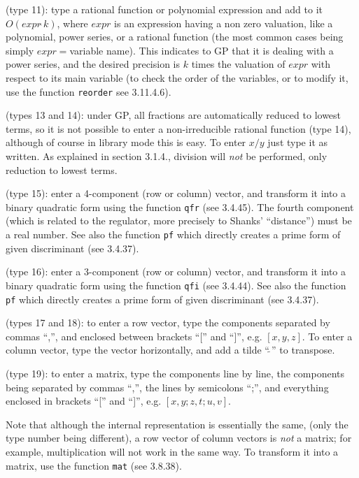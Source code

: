 \subsec{\ref{Power series}} (type 11): type a rational function or
polynomial expression and add to it $O(expr\hat{\ }k)$, where $expr$ is an
expression
having a non zero valuation, like a polynomial, power series, or a
rational function (the most common cases being simply $expr=$variable name).
This indicates
to GP that it is dealing with a power series, and the desired precision
is $k$ times the valuation of $expr$ with respect to its main variable
(to check the order of the variables, or to modify it, use the function
{\tt reorder} see 3.11.4.6).

 (types 13 and 14): under GP, all
fractions are automatically reduced to lowest terms, so it is not possible
to enter a non-irreducible rational function (type 14), although of course in
library mode this is easy. To enter $x/y$ just type it as written.
As explained in section 3.1.4., division will {\sl not} be performed, only
reduction to lowest terms.

 (type 15):
enter a 4-component (row or column) vector, and transform it into a binary
quadratic form using the function {\tt qfr} (see 3.4.45). The fourth component
(which is related to the regulator, more precisely to Shanks' ``distance'')
must be a real number. See also the function {\tt pf} which directly creates
a prime form of given discriminant (see 3.4.37).

 (type 16):
enter a 3-component (row or column) vector, and transform it into a binary
quadratic form using the function {\tt qfi} (see 3.4.44). See also the
function {\tt pf} which directly creates a prime form of given discriminant
(see 3.4.37).

(types 17 and 18):
to enter a row vector, type the components separated by commas ``,'',
and enclosed between brackets ``['' and ``]'', e.g. $[x,y,z]$.
To enter a column vector, type the vector horizontally, and add a tilde
``$\tilde{\ }$'' to transpose.

 (type 19): to enter a matrix, type the
components line by line, the components being separated by commas ``,'',
the lines by semicolons ``;'', and everything enclosed in brackets
``['' and ``]'', e.g. $[x,y;z,t;u,v]$.

Note that although the internal representation is essentially the same,
(only the type number being different), a row vector of column vectors is
{\sl not} a matrix; for example, multiplication will not work in the same way.
To transform it into a matrix, use the function {\tt mat} (see 3.8.38).

